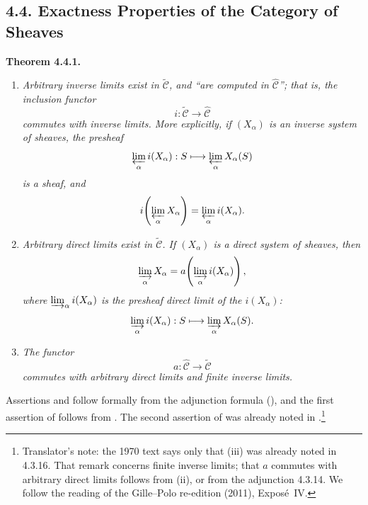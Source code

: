 

\subsection*{4.4. Exactness Properties of the Category of Sheaves}

\medskip
\noindent{}\textbf{Theorem 4.4.1.}
\begin{enumerate}
  \item[(i)] \textit{Arbitrary inverse limits exist in
    \(\widetilde{\mathscr C}\), and \textquotedblleft are computed in
    \(\widehat{\mathscr C}\)\textquotedblright; that is, the inclusion functor
    \[
      i:\widetilde{\mathscr C}\longrightarrow\widehat{\mathscr C}
    \]
    commutes with inverse limits. More explicitly, if \((X_\alpha)\) is an
    inverse system of sheaves, the presheaf}
    \[
      \varprojlim_\alpha i(X_\alpha):
      S\longmapsto\varprojlim_\alpha X_\alpha(S)
    \]
    \textit{is a sheaf, and}
    \[
      i\!\left(\varprojlim_\alpha X_\alpha\right)
      =\varprojlim_\alpha i(X_\alpha).
    \]

  \item[(ii)] \textit{Arbitrary direct limits exist in
    \(\widetilde{\mathscr C}\). If \((X_\alpha)\) is a direct system of
    sheaves, then}
    \[
      \varinjlim_\alpha X_\alpha
      =a\!\left(\varinjlim_\alpha i(X_\alpha)\right),
    \]
    \textit{where \(\varinjlim_\alpha i(X_\alpha)\) is the presheaf direct
    limit of the \(i(X_\alpha)\):}
    \[
      \varinjlim_\alpha i(X_\alpha):
      S\longmapsto\varinjlim_\alpha X_\alpha(S).
    \]

  \item[(iii)] \textit{The functor}
    \[
      a:\widehat{\mathscr C}\longrightarrow\widetilde{\mathscr C}
    \]
    \textit{commutes with arbitrary direct limits and finite inverse limits.}
\end{enumerate}

Assertions  and  follow formally from the adjunction formula
(), and
the first assertion of  follows from . The second assertion of 
was already noted in .\footnote{Translator's note: the 1970 text says only that (iii) was
already noted in 4.3.16. That remark concerns finite inverse limits; that
\(a\) commutes with arbitrary direct limits follows from (ii), or from the
adjunction 4.3.14. We follow the reading of the Gille--Polo re-edition (2011),
Expos\'e~IV.}

